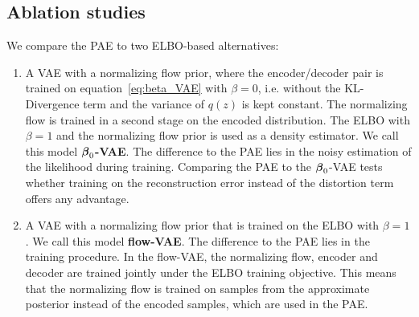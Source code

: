 \documentclass[10pt]{article} \usepackage[accepted]{tmlr}
\def\bi#1{\hbox{\boldmath{$#1$}}}
\begin{document}
\subsection{Ablation studies}
\label{sec:overview}
We compare the PAE to two ELBO-based alternatives:
\begin{enumerate}
\item A VAE with a normalizing flow prior, where the encoder/decoder pair is trained on equation~\ref{eq:beta_VAE} with $\beta{=}0$, i.e. without the KL-Divergence term and the variance of $q(z)$ is kept constant. The normalizing flow is trained in a second stage on the encoded distribution. The ELBO with $\beta{=}1$ and the normalizing flow prior is used as a density estimator. We call this model \textbf{$\bi \beta_0$-VAE}. The difference to the PAE lies in the noisy estimation of the likelihood during training. Comparing the PAE to the $\bi \beta_0$-VAE tests whether training on the reconstruction error instead of the distortion term offers any advantage.

\item A VAE with a  normalizing flow prior that is trained on the ELBO with $\beta{=}1$. We call this model \textbf{flow-VAE}. The difference to the PAE lies in the training procedure. In the flow-VAE, the normalizing flow, encoder and decoder are trained jointly under the ELBO training objective. This means that the normalizing flow is trained on samples from the approximate posterior instead of the encoded samples, which are used in the PAE. 
\end{enumerate}
\end{document}
